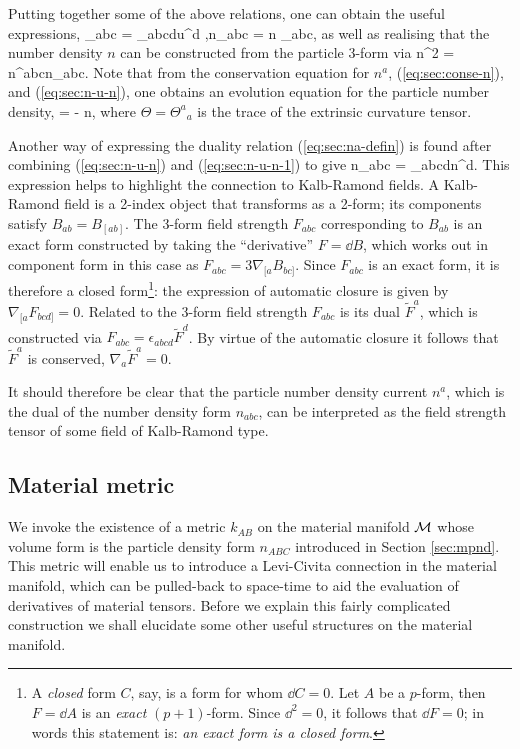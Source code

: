 Putting together some of the above relations, one can obtain the useful expressions,
\bse
\bea
\label{eq:sec:n-u-n-1}
\epsilon_{abc} = \epsilon_{abcd}u^d ,\qquad n_{abc} = n \epsilon_{abc},
\eea
as well as realising that the number density $n$ can be constructed from the particle 3-form via
\bea
n^2 = n^{abc}n_{abc}.
\eea
\ese
Note that from the conservation equation for $n^a$, (\ref{eq:sec:conse-n}), and (\ref{eq:sec:n-u-n}), one obtains an evolution equation for the particle number density,
\bea
\label{ev_n}
 = - n\Theta,
\eea
where $\Theta = {\Theta^a}_a$ is the trace of the extrinsic curvature tensor.
 
Another way  of expressing the duality relation (\ref{eq:sec:na-defin}) is found after combining (\ref{eq:sec:n-u-n}) and (\ref{eq:sec:n-u-n-1}) to give
\bea
\label{eq:sec:nabc_dual_na}
n_{abc} = \epsilon_{abcd}n^d.
\eea
This expression helps to  highlight the connection to Kalb-Ramond fields. A Kalb-Ramond field is a 2-index object that transforms as a 2-form; its components satisfy $B_{ab} = B_{[ab]}$.
The  3-form field strength $F_{abc}$ corresponding  to $B_{ab}$ is an exact form constructed by taking the ``derivative'' $F = \dd B$, which works out in component form in this case as $F_{abc} = 3\nabla_{[a}B_{bc]}$.
Since $F_{abc}$ is an exact form, it is therefore a closed form\footnote{A \textit{closed} form $C$, say, is a form for whom $\dd C=0$. Let $A$ be a $p$-form, then $F = \dd A$ is an \textit{exact} $(p+1)$-form. Since $\dd^2=0$, it follows that $\dd F=0$; in words this statement is: \textit{an exact form is a closed form}.}: the expression of  automatic closure is given by  $\nabla_{[a}F_{bcd]}=0$. Related to the 3-form field strength $F_{abc}$  is  its dual $\widetilde{F}^a$, which is constructed via $F_{abc} = \epsilon_{abcd}\widetilde{F}^d$. By virtue of the automatic closure  it follows that $\widetilde{F}^a$ is conserved, $\nabla_a\widetilde{F}^a=0$.

It should therefore be clear that the particle number density current $n^a$, which is the dual of the number density form $n_{abc}$, can be interpreted as the field strength tensor of some field of Kalb-Ramond type. 

\subsection{Material metric}
\label{sec:mat-metric}
We invoke the existence of a metric $k_{AB}$ on the material manifold $\mathcal{M}$ whose volume form is the particle density form $n_{ABC}$ introduced in Section \ref{sec:mpnd}. This metric will enable us to introduce a Levi-Civita connection in the material manifold, which can be pulled-back to space-time to aid the evaluation of derivatives of material tensors. Before we explain this fairly complicated construction we shall elucidate some other useful structures on the material manifold.


